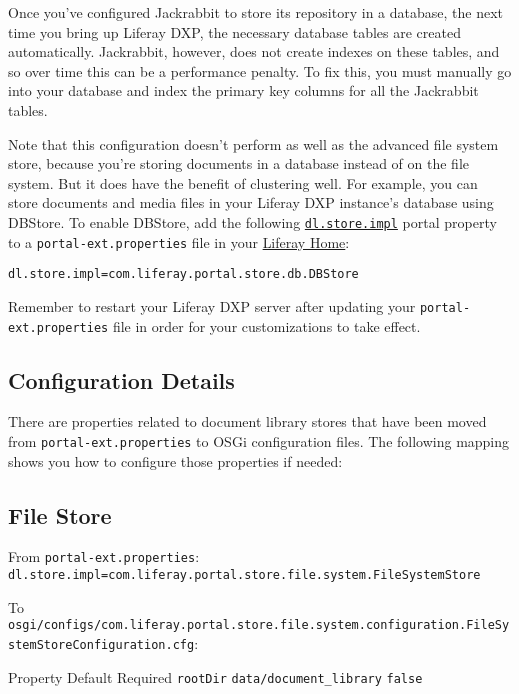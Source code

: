 Once you've configured Jackrabbit to store its repository in a database,
the next time you bring up Liferay DXP, the necessary database tables
are created automatically. Jackrabbit, however, does not create indexes
on these tables, and so over time this can be a performance penalty. To
fix this, you must manually go into your database and index the primary
key columns for all the Jackrabbit tables.

Note that this configuration doesn't perform as well as the advanced
file system store, because you're storing documents in a database
instead of on the file system. But it does have the benefit of
clustering well. For example, you can store documents and media files in
your Liferay DXP instance's database using DBStore. To enable DBStore,
add the following
\href{@platform-ref@/7.0-latest/propertiesdoc/portal.properties.html\#Document\%20Library\%20Service}{\texttt{dl.store.impl}}
portal property to a \texttt{portal-ext.properties} file in your
\href{/docs/7-0/deploy/-/knowledge_base/d/installing-product\#liferay-home}{Liferay
Home}:

\begin{verbatim}
dl.store.impl=com.liferay.portal.store.db.DBStore
\end{verbatim}

Remember to restart your Liferay DXP server after updating your
\texttt{portal-ext.properties} file in order for your customizations to
take effect.

\subsection{Configuration Details}\label{configuration-details}

There are properties related to document library stores that have been
moved from \texttt{portal-ext.properties} to OSGi configuration files.
The following mapping shows you how to configure those properties if
needed:

\subsection{File Store}\label{file-store}

From \texttt{portal-ext.properties}:
\texttt{dl.store.impl=com.liferay.portal.store.file.system.FileSystemStore}

To
\texttt{osgi/configs/com.liferay.portal.store.file.system.configuration.FileSystemStoreConfiguration.cfg}:

Property \textbar{} Default \textbar{} Required \texttt{rootDir}
\textbar{} \texttt{data/document\_library} \textbar{} \texttt{false}

